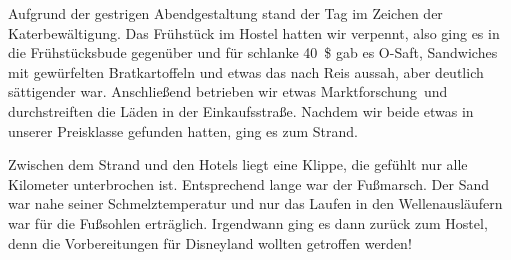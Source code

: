 Aufgrund der gestrigen Abendgestaltung stand der Tag im Zeichen der Katerbewältigung.
Das Frühstück im Hostel hatten wir verpennt, also ging es in die Frühstücksbude gegenüber und für schlanke 40~\$ gab es O-Saft, Sandwiches mit gewürfelten Bratkartoffeln und etwas das nach Reis aussah, aber deutlich sättigender war.
Anschließend betrieben wir etwas \glqq Marktforschung\grqq \, und durchstreiften die Läden in der Einkaufsstraße.
Nachdem wir beide etwas in unserer Preisklasse gefunden hatten, ging es zum Strand.

Zwischen dem Strand und den Hotels liegt eine Klippe, die gefühlt nur alle Kilometer unterbrochen ist.
Entsprechend lange war der Fußmarsch.
Der Sand war nahe seiner Schmelztemperatur und nur das Laufen in den Wellenausläufern war für die Fußsohlen erträglich.
Irgendwann ging es dann zurück zum Hostel, denn die Vorbereitungen für Disneyland wollten getroffen werden!
